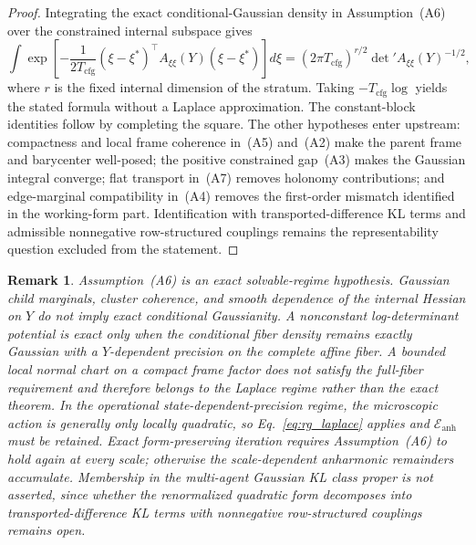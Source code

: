 \documentclass[11pt]{article}
\newtheorem{remark}{Remark}
\begin{document}
\begin{proof}
Integrating the exact conditional-Gaussian density in Assumption~(A6) over the constrained internal subspace gives
\begin{equation}
\int\exp\left[-\frac{1}{2T_{\mathrm{cfg}}}(\xi-\xi^*)^\top A_{\xi\xi}(Y)(\xi-\xi^*)\right]d\xi
=(2\pi T_{\mathrm{cfg}})^{r/2}\det{}'A_{\xi\xi}(Y)^{-1/2},
\end{equation}
where $r$ is the fixed internal dimension of the stratum. Taking $-T_{\mathrm{cfg}}\log$ yields the stated formula without a Laplace approximation. The constant-block identities follow by completing the square. The other hypotheses enter upstream: compactness and local frame coherence in~(A5) and~(A2) make the parent frame and barycenter well-posed; the positive constrained gap~(A3) makes the Gaussian integral converge; flat transport in~(A7) removes holonomy contributions; and edge-marginal compatibility in~(A4) removes the first-order mismatch identified in the working-form part. Identification with transported-difference KL terms and admissible nonnegative row-structured couplings remains the representability question excluded from the statement.
\end{proof}

\begin{remark}
Assumption~(A6) is an exact solvable-regime hypothesis. Gaussian child marginals, cluster coherence, and smooth dependence of the internal Hessian on $Y$ do not imply exact conditional Gaussianity. A nonconstant log-determinant potential is exact only when the conditional fiber density remains exactly Gaussian with a $Y$-dependent precision on the complete affine fiber. A bounded local normal chart on a compact frame factor does not satisfy the full-fiber requirement and therefore belongs to the Laplace regime rather than the exact theorem. In the operational state-dependent-precision regime, the microscopic action is generally only locally quadratic, so Eq.~\eqref{eq:rg_laplace} applies and $\mathcal{E}_{\mathrm{anh}}$ must be retained. Exact form-preserving iteration requires Assumption~(A6) to hold again at every scale; otherwise the scale-dependent anharmonic remainders accumulate. Membership in the multi-agent Gaussian KL class proper is not asserted, since whether the renormalized quadratic form decomposes into transported-difference KL terms with nonnegative row-structured couplings remains open.
\end{remark}
\end{document}
